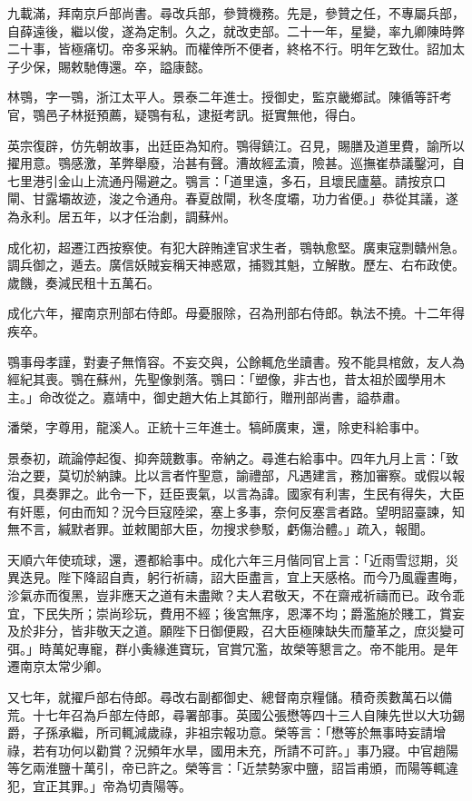 \begin{pinyinscope}
九載滿，拜南京戶部尚書。尋改兵部，參贊機務。先是，參贊之任，不專屬兵部，自薛遠後，繼以俊，遂為定制。久之，就改吏部。二十一年，星變，率九卿陳時弊二十事，皆極痛切。帝多采納。而權倖所不便者，終格不行。明年乞致仕。詔加太子少保，賜敕馳傳還。卒，謚康懿。

林鶚，字一鶚，浙江太平人。景泰二年進士。授御史，監京畿鄉試。陳循等訐考官，鶚邑子林挺預薦，疑鶚有私，逮挺考訊。挺實無他，得白。

英宗復辟，仿先朝故事，出廷臣為知府。鶚得鎮江。召見，賜膳及道里費，諭所以擢用意。鶚感激，革弊舉廢，治甚有聲。漕故經孟瀆，險甚。巡撫崔恭議鑿河，自七里港引金山上流通丹陽避之。鶚言：「道里遠，多石，且壞民廬墓。請按京口閘、甘露壩故迹，浚之令通舟。春夏啟閘，秋冬度壩，功力省便。」恭從其議，遂為永利。居五年，以才任治劇，調蘇州。

成化初，超遷江西按察使。有犯大辟賄達官求生者，鶚執愈堅。廣東寇剽贛州急。調兵御之，遁去。廣信妖賊妄稱天神惑眾，捕戮其魁，立解散。歷左、右布政使。歲饑，奏減民租十五萬石。

成化六年，擢南京刑部右侍郎。母憂服除，召為刑部右侍郎。執法不撓。十二年得疾卒。

鶚事母孝謹，對妻子無惰容。不妄交與，公餘輒危坐讀書。歿不能具棺斂，友人為經紀其喪。鶚在蘇州，先聖像剝落。鶚曰：「塑像，非古也，昔太祖於國學用木主。」命改從之。嘉靖中，御史趙大佑上其節行，贈刑部尚書，謚恭肅。

潘榮，字尊用，龍溪人。正統十三年進士。犒師廣東，還，除吏科給事中。

景泰初，疏論停起復、抑奔競數事。帝納之。尋進右給事中。四年九月上言：「致治之要，莫切於納諫。比以言者忤聖意，諭禮部，凡遇建言，務加審察。或假以報復，具奏罪之。此令一下，廷臣喪氣，以言為諱。國家有利害，生民有得失，大臣有奸慝，何由而知？況今巨寇陸梁，塞上多事，奈何反塞言者路。望明詔臺諫，知無不言，緘默者罪。並敕閣部大臣，勿搜求參駁，虧傷治體。」疏入，報聞。

天順六年使琉球，還，遷都給事中。成化六年三月偕同官上言：「近雨雪愆期，災異迭見。陛下降詔自責，躬行祈禱，詔大臣盡言，宜上天感格。而今乃風霾晝晦，沴氣赤而復黑，豈非應天之道有未盡歟？夫人君敬天，不在齋戒祈禱而已。政令乖宜，下民失所；崇尚珍玩，費用不經；後宮無序，恩澤不均；爵濫施於賤工，賞妄及於非分，皆非敬天之道。願陛下日御便殿，召大臣極陳缺失而釐革之，庶災變可弭。」時萬妃專寵，群小夤緣進寶玩，官賞冗濫，故榮等懇言之。帝不能用。是年遷南京太常少卿。

又七年，就擢戶部右侍郎。尋改右副都御史、總督南京糧儲。積奇羨數萬石以備荒。十七年召為戶部左侍郎，尋署部事。英國公張懋等四十三人自陳先世以大功錫爵，子孫承繼，所司輒減歲祿，非祖宗報功意。榮等言：「懋等於無事時妄請增祿，若有功何以勸賞？況頻年水旱，國用未充，所請不可許。」事乃寢。中官趙陽等乞兩淮鹽十萬引，帝已許之。榮等言：「近禁勢家中鹽，詔旨甫頒，而陽等輒違犯，宜正其罪。」帝為切責陽等。


\end{pinyinscope}

